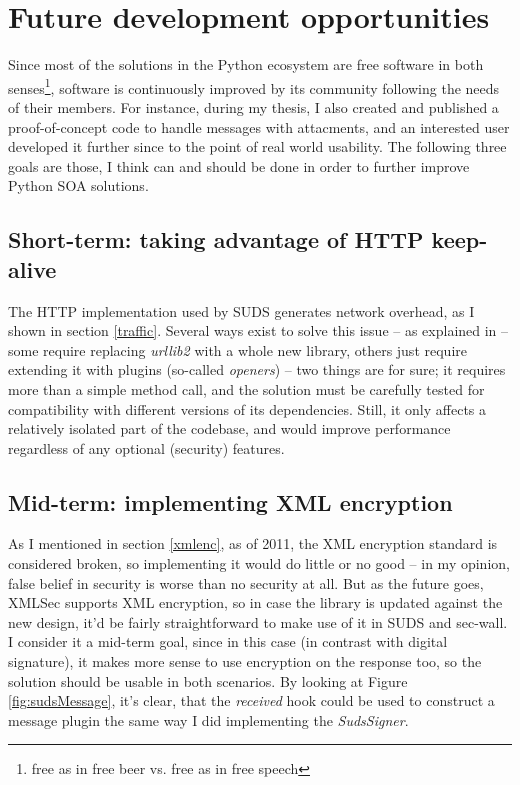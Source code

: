 \section{Future development opportunities}

Since most of the solutions in the Python ecosystem are free software in both senses\footnote{free as in free beer vs. free as in free speech}, software is continuously improved by its community following the needs of their members. For instance, during my thesis, I also created and published a proof-of-concept code to handle messages with attacments, and an interested user developed it further since to the point of real world usability. The following three goals are those, I think can and should be done in order to further improve Python SOA solutions.

\subsection{Short-term: taking advantage of HTTP keep-alive}
\label{keepalive}

The HTTP implementation used by SUDS generates network overhead, as I shown in section \ref{traffic}. Several ways exist to solve this issue -- as explained in \cite{so-1037406} -- some require replacing \emph{urllib2} with a whole new library, others just require extending it with plugins (so-called \emph{openers}) -- two things are for sure; it requires more than a simple method call, and the solution must be carefully tested for compatibility with different versions of its dependencies. Still, it only affects a relatively isolated part of the codebase, and would improve performance regardless of any optional (security) features.

\subsection{Mid-term: implementing XML encryption}

As I mentioned in section \ref{xmlenc}, as of 2011, the XML encryption standard is considered broken, so implementing it would do little or no good -- in my opinion, false belief in security is worse than no security at all. But as the future goes, XMLSec supports XML encryption, so in case the library is updated against the new design, it'd be fairly straightforward to make use of it in SUDS and sec-wall. I consider it a mid-term goal, since in this case (in contrast with digital signature), it makes more sense to use encryption on the response too, so the solution should be usable in both scenarios. By looking at Figure \ref{fig:sudsMessage}, it's clear, that the \emph{received} hook could be used to construct a message plugin the same way I did implementing the \emph{SudsSigner}.

